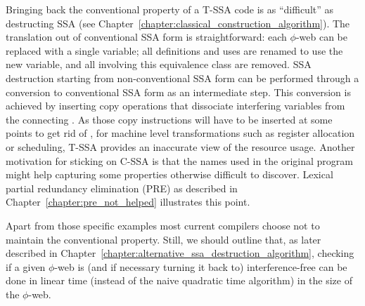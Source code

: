 Bringing back the conventional property of a T-SSA code is as ``difficult'' as destructing SSA (see Chapter~\ref{chapter:classical_construction_algorithm}). 
The translation out of conventional SSA form
is straightforward: each $\phi$-web can be replaced with a single
variable; all definitions and uses are renamed to use the new variable,
and all \phifuns involving this equivalence class are removed. 
SSA destruction
starting from non-conventional SSA form can be performed through a conversion to 
conventional SSA form as an intermediate step. This conversion is
achieved by inserting copy operations that dissociate interfering variables from the connecting \phifuns. 
As those copy instructions will have to be inserted at some points to get rid of \phifuns, for machine level transformations such as register allocation or scheduling, T-SSA provides an inaccurate view of the resource usage. Another motivation for sticking on C-SSA is that the names used in the original program might help capturing some properties otherwise difficult to discover. Lexical partial redundancy elimination (PRE) as described in Chapter~\ref{chapter:pre_not_helped} illustrates this point.

Apart from those specific examples most current compilers choose not to maintain the conventional property.
Still, we should outline that, as later described in Chapter~\ref{chapter:alternative_ssa_destruction_algorithm}, checking if a given $\phi$-web is (and if necessary turning it back to) interference-free can be done in linear time (instead of the naive quadratic time algorithm) in the size of the $\phi$-web.

